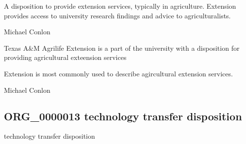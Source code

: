 \documentclass[letterpaper,10pt,english]{sphinxmanual}
\begin{document}
\begin{sphinxShadowBox}

\sphinxAtStartPar
A disposition to provide extension services, typically in agriculture.  Extension provides access to university research findings and advice to agriculturalists.
\end{sphinxShadowBox}

\begin{sphinxShadowBox}

\sphinxAtStartPar
Michael Conlon 
\end{sphinxShadowBox}

\begin{sphinxShadowBox}

\sphinxAtStartPar
Texas A\&M Agrilife Extension is a part of the university with a disposition for providing agricultural exteension services
\end{sphinxShadowBox}

\begin{sphinxShadowBox}

\sphinxAtStartPar
Extension is most commonly used to describe agircultural extension services.
\end{sphinxShadowBox}

\begin{sphinxShadowBox}

\sphinxAtStartPar
Michael Conlon 
\end{sphinxShadowBox}
\begin{quote}

\ignorespaces \end{quote}


\subsection{ORG\_0000013 \sphinxhyphen{} technology transfer disposition}
\label{\detokenize{doc-ORG_0000013:org-0000013-technology-transfer-disposition}}\label{\detokenize{doc-ORG_0000013:index-0}}\label{\detokenize{doc-ORG_0000013::doc}}
\begin{sphinxShadowBox}

\sphinxAtStartPar
technology transfer disposition
\end{sphinxShadowBox}
\end{document}
